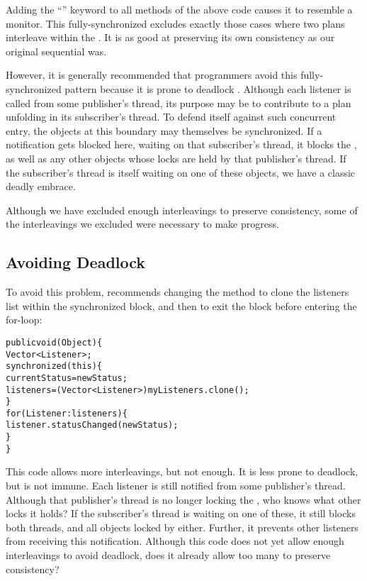 \documentclass{llncs}
\begin{document}
Adding the ``'' keyword to all methods of the above
code causes it to resemble a monitor. This fully-synchronized
 excludes exactly those cases where two plans
interleave within the . It is as good at preserving
its own consistency as our original sequential 
was.

However, it is generally recommended that  programmers avoid
this fully-synchronized pattern because it is prone to deadlock
\cite{Englander:beans}. Although each listener is called from some
publisher's thread, its purpose may be to contribute to a plan
unfolding in its subscriber's thread. To defend itself against such
concurrent entry, the objects at this boundary may themselves be
synchronized. If a  notification gets blocked
here, waiting on that subscriber's thread, it blocks the
, as well as any other objects whose locks are held
by that publisher's thread. If the subscriber's thread is itself
waiting on one of these objects, we have a classic deadly embrace.

Although we have excluded enough interleavings to preserve
consistency, some of the interleavings we excluded were necessary to
make progress.

\subsection{Avoiding Deadlock}

To avoid this problem, \cite{Englander:beans} recommends changing the
 method to clone the listeners list within the
synchronized block, and then to exit the block before entering the
for-loop:
%
\begin{alltt}
    public void (Object ) \{
        Vector<Listener> ;
        synchronized (this) \{
            currentStatus = newStatus;
            listeners = (Vector<Listener>) myListeners.clone();
        \}
        for (Listener : listeners) \{
            listener.statusChanged(newStatus);
        \}
    \}
\end{alltt}
%
This code allows more interleavings, but not enough. It is less prone
to deadlock, but is not immune. Each listener is still notified from
some publisher's thread. Although that publisher's thread is no longer
locking the , who knows what other locks it holds?
If the subscriber's thread is waiting on one of these, it still blocks
both threads, and all objects locked by either. Further, it prevents
other listeners from receiving this notification. Although this code
does not yet allow enough interleavings to avoid deadlock, does it
already allow too many to preserve consistency?
\end{document}
